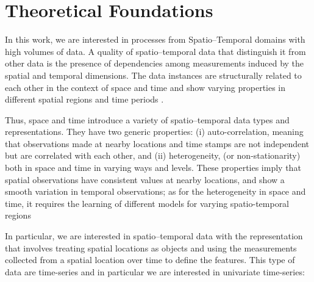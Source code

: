 \chapter{Theoretical Foundations}\label{chapter_Theoretical_Foundations}



In this work, we are interested in processes from Spatio--Temporal domains with high volumes of data. 
A quality of spatio--temporal data that distinguish it from other data is the presence of dependencies among measurements induced by the spatial and temporal dimensions. The data instances are structurally related to each other in the context of space and time and show varying properties in different spatial regions and time periods \cite{Atluri2018}. 

Thus, space and time introduce a variety of spatio--temporal data types and representations. They have two generic properties: (i) auto-correlation, meaning that observations made at nearby locations and time stamps are not independent but are correlated with each other, and (ii) heterogeneity, (or non-stationarity) both in space and time in varying ways and levels. These properties imply that spatial observations have consistent values at nearby locations, and show a smooth variation in temporal observations; as for the heterogeneity in space and time, it requires the learning of different models for varying spatio-temporal regions \cite{Wikle2019}

In particular, we are interested in spatio--temporal data with the representation that involves treating spatial locations as objects and using the measurements collected from a spatial location over time to define the features. This type of data are time-series and in particular we are interested in univariate time-series:

